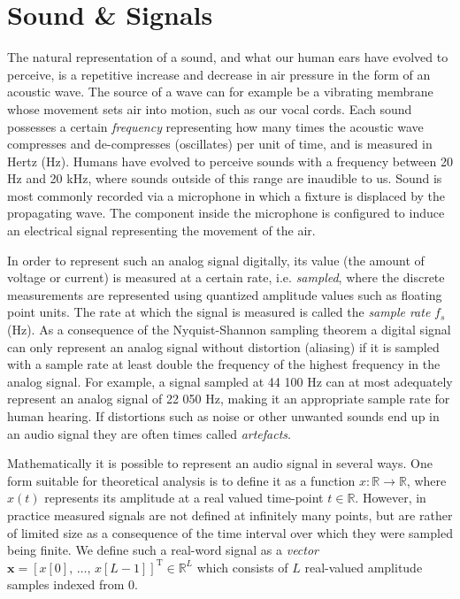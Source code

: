 \documentclass{report}
\begin{document}
\section{Sound \& Signals} \label{sec:sounds}

The natural representation of a sound, and what our human ears have evolved to perceive, is a repetitive increase and decrease in air pressure in the form of an acoustic wave. The source of a wave can for example be a vibrating membrane whose movement sets air into motion, such as our vocal cords. Each sound possesses a certain \textit{frequency} representing how many times the acoustic wave compresses and de-compresses (oscillates) per unit of time, and is measured in Hertz (Hz). Humans have evolved to perceive sounds with a frequency between 20 Hz and 20 kHz, where sounds outside of this range are inaudible to us. Sound is most commonly recorded via a microphone in which a fixture is displaced by the propagating wave. The component inside the microphone is configured to induce an electrical signal representing the movement of the air.

In order to represent such an analog signal digitally, its value (the amount of voltage or current) is measured at a certain rate, i.e. \textit{sampled}, where the discrete measurements are represented using quantized amplitude values such as floating point units. The rate at which the signal is measured is called the \textit{sample rate} $f_s$ (Hz). As a consequence of the Nyquist-Shannon sampling theorem a digital signal can only represent an analog signal without distortion (aliasing) if it is sampled with a sample rate at least double the frequency of the highest frequency in the analog signal. For example, a signal sampled at 44 100 Hz can at most adequately represent an analog signal of 22 050 Hz, making it an appropriate sample rate for human hearing. If distortions such as noise or other unwanted sounds end up in an audio signal they are often times called \textit{artefacts}.

Mathematically it is possible to represent an audio signal in several ways. One form suitable for theoretical analysis is to define it as a function $x: \mathbb{R} \rightarrow \mathbb{R}$, where $x(t)$ represents its amplitude at a real valued time-point $t \in \mathbb{R}$. However, in practice measured signals are not defined at infinitely many points, but are rather of limited size as a consequence of the time interval over which they were sampled being finite. We define such a real-word signal as a \textit{vector} $\bm{x} = [x[0], \, \dots, \, x[L-1]]^{\text{T}} \in \mathbb{R}^{L}$ which consists of $L$ real-valued amplitude samples indexed from $0$.
\end{document}
